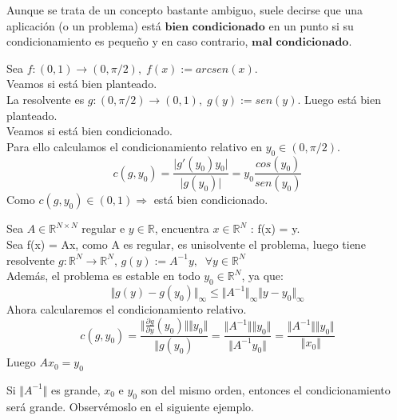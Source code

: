 \begin{nota}
Aunque se trata de un concepto bastante ambiguo, suele decirse que una aplicación (o un problema) está $\textbf{bien condicionado}$ en un punto si su condicionamiento es pequeño y en caso contrario, $\textbf{mal condicionado}$.
\end{nota}

\begin{ejemplo}
Sea $f : (0,1) \rightarrow (0, \pi / 2), \; f(x) := arcsen(x)$.\\
Veamos si está bien planteado.\\
La resolvente es $g : (0, \pi / 2) \rightarrow (0,1), \; g(y) := sen(y)$. Luego está bien planteado.\\
Veamos si está bien condicionado.\\ Para ello calculamos el condicionamiento relativo en $y_0 \in (0, \pi / 2)$.\\
\[ c(g,y_0) = \frac{\vert g'(y_0)y_0 \vert }{\vert g(y_0) \vert} = y_0 \frac{cos(y_0)}{sen(y_0)} \]
Como $c(g,y_0) \in (0,1) \Rightarrow$ está bien condicionado.
\end{ejemplo}

\begin{ejemplo}
Sea $A \in \mathbb{R}^{N \times N}$ regular e $y \in \mathbb{R}$, encuentra $x \in \mathbb{R}^N$ : f(x) = y.\\
Sea f(x) = Ax, como A es regular, es unisolvente el problema, luego tiene resolvente $g : \mathbb{R}^N \rightarrow \mathbb{R}^N$, $g(y) := A^{-1}y, \; \; \forall y \in \mathbb{R}^N$\\
Además, el problema es estable en todo $y_0 \in \mathbb{R}^N$, ya que:
\[ \Vert g(y) - g(y_0) \Vert _\infty \leq \Vert A^{-1} \Vert _\infty \Vert y - y_0 \Vert _\infty \]
Ahora calcularemos el condicionamiento relativo.
\[ c(g, y_0) = \frac{\Vert \frac{\partial g}{\partial y} (y_0) \Vert \Vert y_0 \Vert }{\Vert g(y_0)} = \frac{\Vert A^{-1} \Vert \Vert y_0 \Vert }{\Vert A^{-1} y_0 \Vert } = \frac{\Vert A^{-1} \Vert \Vert y_0 \Vert }{\Vert x_0 \Vert } \]
Luego $Ax_0 = y_0$
\end{ejemplo}

Si $\Vert A^{-1} \Vert$ es grande, $x_0$ e $y_0$ son del mismo orden, entonces el condicionamiento será grande. Observémoslo en el siguiente ejemplo.

